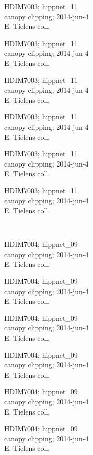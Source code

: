 \documentclass[2pt]{extarticle}
\begin{document}
\noindent
\parbox{0.16\textwidth}{\tiny \raggedright \rule[-0.3\baselineskip]{0pt}{10pt}HDIM7003; hippnet\_11\\ canopy clipping; 2014-jun-4\\ E. Tielens coll.}
\parbox{0.16\textwidth}{\tiny \raggedright \rule[-0.3\baselineskip]{0pt}{10pt}HDIM7003; hippnet\_11\\ canopy clipping; 2014-jun-4\\ E. Tielens coll.}
\parbox{0.16\textwidth}{\tiny \raggedright \rule[-0.3\baselineskip]{0pt}{10pt}HDIM7003; hippnet\_11\\ canopy clipping; 2014-jun-4\\ E. Tielens coll.}
\parbox{0.16\textwidth}{\tiny \raggedright \rule[-0.3\baselineskip]{0pt}{10pt}HDIM7003; hippnet\_11\\ canopy clipping; 2014-jun-4\\ E. Tielens coll.}
\parbox{0.16\textwidth}{\tiny \raggedright \rule[-0.3\baselineskip]{0pt}{10pt}HDIM7003; hippnet\_11\\ canopy clipping; 2014-jun-4\\ E. Tielens coll.}
\parbox{0.16\textwidth}{\tiny \raggedright \rule[-0.3\baselineskip]{0pt}{10pt}HDIM7003; hippnet\_11\\ canopy clipping; 2014-jun-4\\ E. Tielens coll.} \\ 
\vspace{0.001in} 

\noindent
\parbox{0.16\textwidth}{\tiny \raggedright \rule[-0.3\baselineskip]{0pt}{10pt}HDIM7004; hippnet\_09\\ canopy clipping; 2014-jun-4\\ E. Tielens coll.}
\parbox{0.16\textwidth}{\tiny \raggedright \rule[-0.3\baselineskip]{0pt}{10pt}HDIM7004; hippnet\_09\\ canopy clipping; 2014-jun-4\\ E. Tielens coll.}
\parbox{0.16\textwidth}{\tiny \raggedright \rule[-0.3\baselineskip]{0pt}{10pt}HDIM7004; hippnet\_09\\ canopy clipping; 2014-jun-4\\ E. Tielens coll.}
\parbox{0.16\textwidth}{\tiny \raggedright \rule[-0.3\baselineskip]{0pt}{10pt}HDIM7004; hippnet\_09\\ canopy clipping; 2014-jun-4\\ E. Tielens coll.}
\parbox{0.16\textwidth}{\tiny \raggedright \rule[-0.3\baselineskip]{0pt}{10pt}HDIM7004; hippnet\_09\\ canopy clipping; 2014-jun-4\\ E. Tielens coll.}
\parbox{0.16\textwidth}{\tiny \raggedright \rule[-0.3\baselineskip]{0pt}{10pt}HDIM7004; hippnet\_09\\ canopy clipping; 2014-jun-4\\ E. Tielens coll.} \\ 
\vspace{0.001in} 
\end{document}
